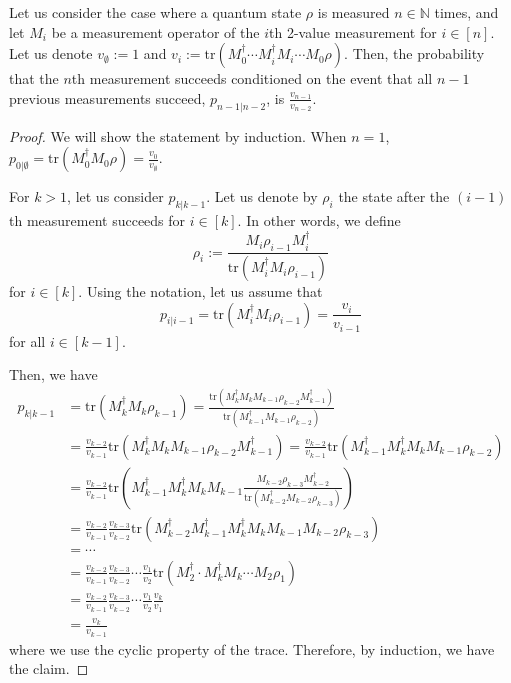 \begin{lemma}\label{lem:ratio}
    Let us consider the case where a quantum state $\rho$ is measured $n \in \mathbb{N}$ times, and let $M_i$ be a measurement operator of the $i$th 2-value measurement for $i \in [n]$. Let us denote $v_\emptyset:=1$ and $v_i := \mathrm{tr}(M_0^\dagger\cdots M_{i}^\dagger M_{i}\cdots M_0 \rho )$. Then, the probability that the $n$th measurement succeeds conditioned on the event that all $n-1$ previous measurements succeed, $p_{n-1|n-2}$, is $\frac{v_{n-1}}{v_{n-2}}$.
\end{lemma}
\begin{proof}
    We will show the statement by induction. When $n=1$, $p_{0|\emptyset} = \mathrm{tr}(M_0^\dagger M_0 \rho) = \frac{v_0}{v_\emptyset}$.
    
    For $k>1$, let us consider $p_{k|k-1}$. Let us denote by $\rho_i$ the state after the $(i-1)$th measurement succeeds for $i \in [k]$. In other words, we define
    \[
        \rho_i := \frac{M_i \rho_{i-1} M_i^\dagger}{\mathrm{tr}(M_i^\dagger M_i \rho_{i-1})}
    \]
    for $i \in [k]$. Using the notation, let us assume that 
    \[
        p_{i|i-1} = \mathrm{tr}(M_{i}^\dagger M_{i} \rho_{i-1}) = \frac{v_{i}}{v_{i-1}}
    \]
    for all $i \in [k-1]$.

    Then, we have
    \begin{align*}
        p_{k|k-1} &= \mathrm{tr}(M_k^\dagger M_k \rho_{k-1}) = \frac{\mathrm{tr}(M_k^\dagger M_k M_{k-1} \rho_{k-2} M_{k-1}^\dagger)}{\mathrm{tr}(M_{k-1}^\dagger M_{k-1} \rho_{k-2})} \\
        &= \frac{v_{k-2}}{v_{k-1}} \mathrm{tr}(M_k^\dagger M_k M_{k-1} \rho_{k-2} M_{k-1}^\dagger) = \frac{v_{k-2}}{v_{k-1}} \mathrm{tr}(M_{k-1}^\dagger M_k^\dagger M_k M_{k-1} \rho_{k-2}) \\
        &= \frac{v_{k-2}}{v_{k-1}} \mathrm{tr}(M_{k-1}^\dagger M_k^\dagger M_k M_{k-1} \frac{M_{k-2} \rho_{k-3} M_{k-2}^\dagger}{\mathrm{tr}(M_{k-2}^\dagger M_{k-2} \rho_{k-3})}) \\
        &= \frac{v_{k-2}}{v_{k-1}} \frac{v_{k-3}}{v_{k-2}} \mathrm{tr}(M_{k-2}^\dagger M_{k-1}^\dagger M_k^\dagger M_k M_{k-1} M_{k-2} \rho_{k-3}) \\
        &= \cdots \\
        &= \frac{v_{k-2}}{v_{k-1}} \frac{v_{k-3}}{v_{k-2}} \cdots \frac{v_1}{v_2}\mathrm{tr}(M_2^\dagger \cdot M_k^\dagger M_k \cdots M_2 \rho_1) \\
        &= \frac{v_{k-2}}{v_{k-1}} \frac{v_{k-3}}{v_{k-2}} \cdots \frac{v_1}{v_2} \frac{v_k}{v_1}\\
        &= \frac{v_k}{v_{k-1}}
    \end{align*}
    where we use the cyclic property of the trace.
    Therefore, by induction, we have the claim.
\end{proof}


